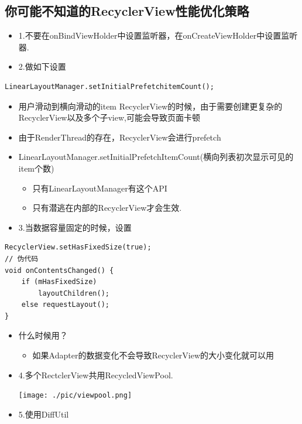 \documentclass[9pt, b5paper]{article}
\begin{document}
\subsection{你可能不知道的RecyclerView性能优化策略}
\label{sec-5-5}
\begin{itemize}
\item 1.不要在onBindViewHolder中设置监听器，在onCreateViewHolder中设置监听器.
\item 2.做如下设置
\end{itemize}
\begin{verbatim}
LinearLayoutManager.setInitialPrefetchitemCount();
\end{verbatim}
\begin{itemize}
\item 用户滑动到横向滑动的item RecyclerView的时候，由于需要创建更复杂的RecyclerView以及多个子view,可能会导致页面卡顿
\item 由于RenderThread的存在，RecyclerView会进行prefetch
\item LinearLayoutManager.setInitialPrefetchItemCount(横向列表初次显示可见的item个数)
\begin{itemize}
\item 只有LinearLayoutManager有这个API
\item 只有潜逃在内部的RecyclerView才会生效.
\end{itemize}
\item 3.当数据容量固定的时候，设置
\end{itemize}
\begin{verbatim}
RecyclerView.setHasFixedSize(true);
// 伪代码
void onContentsChanged() {
    if (mHasFixedSize) 
        layoutChildren();
    else requestLayout();
}
\end{verbatim}
\begin{itemize}
\item 什么时候用？
\begin{itemize}
\item 如果Adapter的数据变化不会导致RecyclerView的大小变化就可以用
\end{itemize}
\item 4.多个RectclerView共用RecycledViewPool.

\texttt{[image: ./pic/viewpool.png]}
\item 5.使用DiffUtil
\end{itemize}
\end{document}
